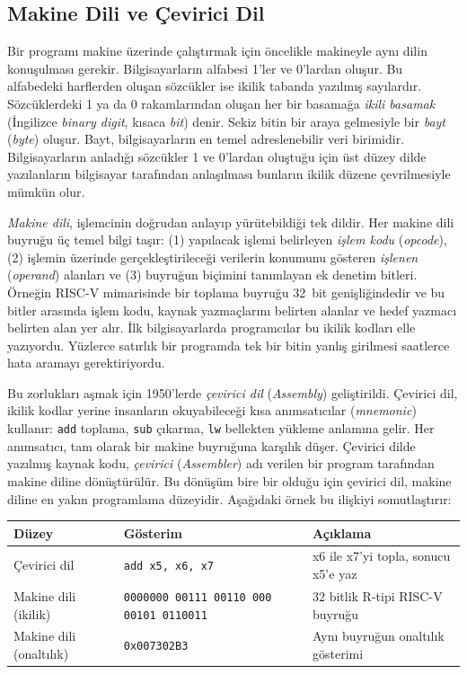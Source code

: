 \subsection{Makine Dili ve Çevirici Dil}
\label{subsec:makine-dili-cevirici}

Bir programı makine üzerinde çalıştırmak için öncelikle makineyle aynı dilin konuşulması gerekir. Bilgisayarların alfabesi 1'ler ve 0'lardan oluşur. Bu alfabedeki harflerden oluşan sözcükler ise ikilik tabanda yazılmış sayılardır. Sözcüklerdeki 1 ya da 0 rakamlarından oluşan her bir basamağa \emph{ikili basamak} (İngilizce \emph{binary digit}, kısaca \emph{bit}) denir. Sekiz bitin bir araya gelmesiyle bir \emph{bayt} (\emph{byte}) oluşur. Bayt, bilgisayarların en temel adreslenebilir veri birimidir. Bilgisayarların anladığı sözcükler 1 ve 0'lardan oluştuğu için üst düzey dilde yazılanların bilgisayar tarafından anlaşılması bunların ikilik düzene çevrilmesiyle mümkün olur.

\emph{Makine dili}, işlemcinin doğrudan anlayıp yürütebildiği tek dildir. Her makine dili buyruğu üç temel bilgi taşır: (1) yapılacak işlemi belirleyen \emph{işlem kodu} (\emph{opcode}), (2) işlemin üzerinde gerçekleştirileceği verilerin konumunu gösteren \emph{işlenen} (\emph{operand}) alanları ve (3) buyruğun biçimini tanımlayan ek denetim bitleri. Örneğin RISC-V mimarisinde bir toplama buyruğu 32~bit genişliğindedir ve bu bitler arasında işlem kodu, kaynak yazmaçlarını belirten alanlar ve hedef yazmacı belirten alan yer alır. İlk bilgisayarlarda programcılar bu ikilik kodları elle yazıyordu. Yüzlerce satırlık bir programda tek bir bitin yanlış girilmesi saatlerce hata aramayı gerektiriyordu.

Bu zorlukları aşmak için 1950'lerde \emph{çevirici dil} (\emph{Assembly}) geliştirildi. Çevirici dil, ikilik kodlar yerine insanların okuyabileceği kısa anımsatıcılar (\emph{mnemonic}) kullanır: \texttt{add} toplama, \texttt{sub} çıkarma, \texttt{lw} bellekten yükleme anlamına gelir. Her anımsatıcı, tam olarak bir makine buyruğuna karşılık düşer. Çevirici dilde yazılmış kaynak kodu, \emph{çevirici} (\emph{Assembler}) adı verilen bir program tarafından makine diline dönüştürülür. Bu dönüşüm bire bir olduğu için çevirici dil, makine diline en yakın programlama düzeyidir. Aşağıdaki örnek bu ilişkiyi somutlaştırır:

\begin{center}
\footnotesize
\begin{tabular}{@{}lll@{}}
\toprule
\textbf{Düzey} & \textbf{Gösterim} & \textbf{Açıklama} \\
\midrule
Çevirici dil & \texttt{add x5, x6, x7} & x6 ile x7'yi topla, sonucu x5'e yaz \\
Makine dili (ikilik) & \texttt{0000000\,00111\,00110\,000\,00101\,0110011} & 32 bitlik R-tipi RISC-V buyruğu \\
Makine dili (onaltılık) & \texttt{0x007302B3} & Aynı buyruğun onaltılık gösterimi \\
\bottomrule
\end{tabular}
\end{center}

